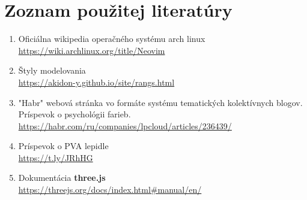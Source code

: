   \newpage
  \section{Zoznam použitej literatúry}

    \begin{enumerate}
      \item{
          Oficiálna wikipedia operačného systému arch linux \\
          \url{https://wiki.archlinux.org/title/Neovim}
      }
      \item{
          Štyly modelovania\\
          \url{https://akidon-y.github.io/site/rangs.html}
      }
      \item{
          "Habr" webová stránka vo formáte systému tematických kolektívnych blogov. Príspevok o psychológii farieb.\\
          \url{https://habr.com/ru/companies/lpcloud/articles/236439/}
      }
      \item{
          Príspevok o PVA lepidle \\
          \url{https://t.ly/JRhHG}
      }
      \item{
          Dokumentácia \textbf{three.js} \\
          \url{https://threejs.org/docs/index.html#manual/en/}
      }
    \end{enumerate}

